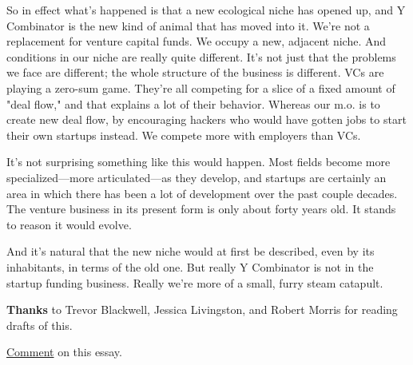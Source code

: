 So in effect
                  what's happened is that a new ecological niche has opened up,
                  and Y Combinator is the new kind of animal that has moved into
                  it. We're not a replacement for venture capital funds. We
                  occupy a new, adjacent niche. And conditions in our niche are
                  really quite different. It's not just that the problems we
                  face are different; the whole structure of the business is
                  different. VCs are playing a zero-sum game. They're all
                  competing for a slice of a fixed amount of "deal flow," and
                  that explains a lot of their behavior. Whereas our m.o. is to
                  create new deal flow, by encouraging hackers who would have
                  gotten jobs to start their own startups instead. We compete
                  more with employers than VCs.

It's not surprising
                  something like this would happen. Most fields become more
                  specialized---more articulated---as they develop, and
                  startups are certainly an area in which there has been a lot
                  of development over the past couple decades. The venture
                  business in its present form is only about forty years old. It
                  stands to reason it would evolve.

And it's natural
                  that the new niche would at first be described, even by its
                  inhabitants, in terms of the old one. But really Y Combinator
                  is not in the startup funding business. Really we're more of a
                  small, furry steam catapult.





\textbf{Thanks}
                  to Trevor Blackwell, Jessica Livingston, and Robert Morris for
                  reading drafts of this.


                  \href{http://news.ycombinator.com/item?id=133430}{Comment}
                  on this essay.



              
            
          
            
              
                


                  
              
            
          
